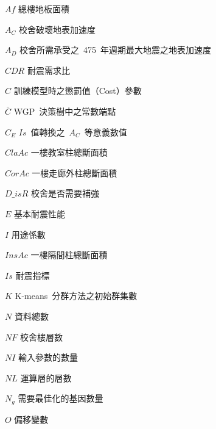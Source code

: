 %
\begin{SymEntry}

\item[$Af$]
總樓地板面積

\item[$A_C$]
校舍破壞地表加速度

\item[$A_D$]
校舍所需承受之~475~年週期最大地震之地表加速度

\item[$CDR$]
耐震需求比

\item[$C$]
訓練模型時之懲罰值（Cost）參數

\item[$\bar{C}$]
WGP~決策樹中之常數端點
\item[$C_E$]
$Is$~值轉換之~$A_C$~等意義數值

\item[$ClaAc$]
一樓教室柱總斷面積

\item[$CorAc$]
一樓走廊外柱總斷面積

\item[$D\_isR$]
校舍是否需要補強

\item[$E$]
基本耐震性能

\item[$I$]
用途係數

\item[$InsAc$]
一樓隔間柱總斷面積

\item[$Is$]
耐震指標

\item[$K$]
K-means~分群方法之初始群集數

\item[$N$]
資料總數

\item[$NF$]
校舍樓層數

\item[$NI$]
輸入參數的數量

\item[$NL$]
運算層的層數

\item[$N_g$]
需要最佳化的基因數量

\item[$O$]
偏移變數


\end{SymEntry}
